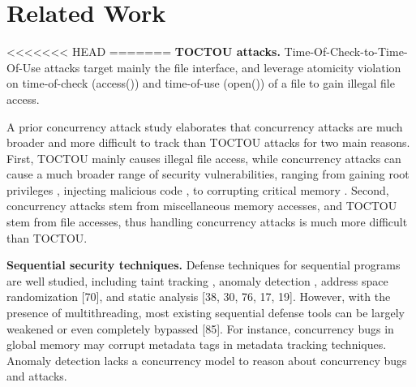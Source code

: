 \section{Related Work} \label{sec:related}


<<<<<<< HEAD
=======
\textbf{TOCTOU attacks.} Time-Of-Check-to-Time-Of-Use attacks \cite{bishop1996checking,tsyrklevich2003dynamic, tsafrir2008portably,wei2005tocttou}
target mainly the file interface, and
leverage atomicity violation on time-of-check (access())
and time-of-use (open()) of a file to gain illegal file access.

A prior concurrency attack study \cite{yang2016concurrency} elaborates that concurrency
attacks are much broader and more difficult to track
than TOCTOU attacks for two main reasons. First, TOCTOU
mainly causes illegal file access, while concurrency attacks
can cause a much broader range of security vulnerabilities,
ranging from gaining root privileges \cite{uselib-bug-12791} , injecting malicious
code \cite{freebsdcve}, to corrupting critical memory \cite{apache-bug-25520}. Second, concurrency
attacks stem from miscellaneous memory accesses, and
TOCTOU stem from file accesses, thus handling concurrency
attacks is much more difficult than TOCTOU.

\noindent
\textbf{Sequential security techniques.} Defense techniques for sequential
programs are well studied, including taint tracking \cite{taintdroid:osdi10,lift:micro06,sospinfomationflowcontrol,valgrind:pldi}, 
anomaly detection \cite{taskrecycling:ppopp90,schonberg:pldi89}, address space
randomization [70], and static analysis [38, 30, 76, 17, 19].
However, with the presence of multithreading, most existing
sequential defense tools can be largely weakened or even
completely bypassed [85]. For instance, concurrency bugs
in global memory may corrupt metadata tags in metadata
tracking techniques. Anomaly detection lacks a concurrency
model to reason about concurrency bugs and attacks.

